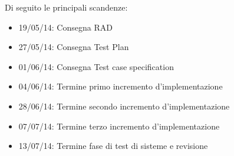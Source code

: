 Di seguito le principali scandenze:
\begin{itemize}
\item 19/05/14: Consegna RAD
\item 27/05/14: Consegna Test Plan
\item 01/06/14: Consegna Test case specification
\item 04/06/14: Termine primo incremento d'implementazione
\item 28/06/14: Termine secondo incremento d'implementazione
\item 07/07/14: Termine terzo incremento d'implementazione
\item 13/07/14: Termine fase di test di sisteme e revisione
\end{itemize}